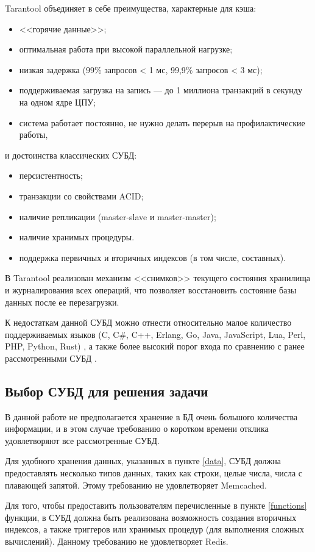 Tarantool объединяет в себе преимущества, характерные для кэша:
\begin{itemize}
	\item <<горячие данные>>;
	\item оптимальная работа при высокой параллельной нагрузке;
	\item низкая задержка (99\% запросов < 1 мс, 99,9\% запросов < 3 мс);
	\item поддерживаемая загрузка на запись — до 1 миллиона транзакций в секунду на одном ядре ЦПУ;
	\item система работает постоянно, не нужно делать перерыв на профилактические работы,
\end{itemize}
и достоинства классических СУБД:
\begin{itemize}
	\item персистентность;
	\item транзакции со свойствами ACID;
	\item наличие репликации (master-slave и master-master);
	\item наличие хранимых процедуры.
	\item поддержка первичных и вторичных индексов (в том числе, составных).
\end{itemize}


В Tarantool реализован механизм <<снимков>> текущего состояния хранилища и журналирования всех операций, что позволяет восстановить состояние базы данных после ее перезагрузки.

К недостаткам данной СУБД можно отнести относительно малое количество поддерживаемых языков (C, C\#, C++, Erlang, Go, Java, JavaScript, Lua, Perl, PHP, Python, Rust) \cite{tarantool}, а также более высокий порог входа по сравнению с ранее рассмотренными СУБД \cite{redis2}.


\subsection{Выбор СУБД для решения задачи}

В данной работе не предполагается хранение в БД очень большого количества информации, и в этом случае требованию о коротком времени отклика удовлетворяют все рассмотренные СУБД.

Для удобного хранения данных, указанных в пункте \ref{data}, СУБД должна предоставлять несколько типов данных, таких как строки, целые числа, числа с плавающей запятой. Этому требованию не удовлетворяет Memcached.
  
Для того, чтобы предоставить пользователям перечисленные в пункте \ref{functions} функции, в СУБД должна быть реализована возможность создания вторичных индексов, а также триггеров или хранимых процедур (для выполнения сложных вычислений). Данному требованию не удовлетворяет Redis.

